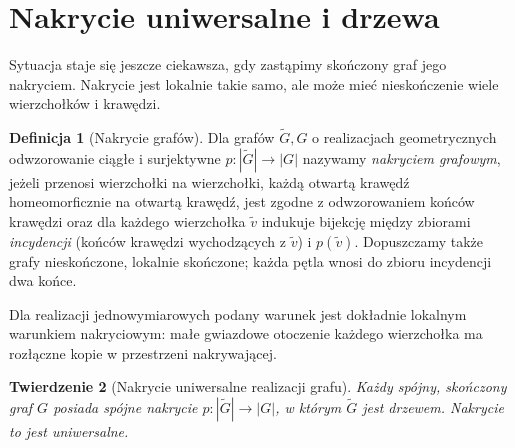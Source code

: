 \documentclass[11pt,a4paper]{report}
\numberwithin{equation}{section}
\theoremstyle{plain}
\newtheorem{twierdzenie}{Twierdzenie}[section]
\theoremstyle{definition}
\newtheorem{definicja}[twierdzenie]{Definicja}
\theoremstyle{remark}
\begin{document}
\begin{center}
\end{center}

\section{Nakrycie uniwersalne i drzewa}
\label{sec:tg-universal-cover}

Sytuacja staje się jeszcze ciekawsza, gdy zastąpimy skończony graf
jego nakryciem. Nakrycie jest lokalnie takie samo, ale może mieć
nieskończenie wiele wierzchołków i krawędzi.

\begin{definicja}[Nakrycie grafów]
Dla grafów $\widetilde G,G$ o realizacjach geometrycznych
odwzorowanie ciągłe i surjektywne
$p:|\widetilde G|\to|G|$ nazywamy
\emph{nakryciem grafowym}, jeżeli przenosi wierzchołki na
wierzchołki, każdą otwartą krawędź homeomorficznie na
otwartą krawędź, jest zgodne z odwzorowaniem końców
krawędzi oraz dla każdego wierzchołka
$\widetilde v$ indukuje bijekcję między zbiorami
\emph{incydencji} (końców krawędzi wychodzących z
$\widetilde v$) i $p(\widetilde v)$.
Dopuszczamy także grafy nieskończone, lokalnie skończone;
każda pętla wnosi do zbioru incydencji dwa końce.
\end{definicja}

Dla realizacji jednowymiarowych podany warunek jest dokładnie
lokalnym warunkiem nakryciowym: małe gwiazdowe otoczenie
każdego wierzchołka ma rozłączne kopie w przestrzeni nakrywającej.

\begin{twierdzenie}[Nakrycie uniwersalne realizacji grafu]
\label{thm:tg-universal}
Każdy spójny, skończony graf $G$ posiada spójne nakrycie
$p:|\widetilde G|\to|G|$, w którym $\widetilde G$ jest drzewem.
Nakrycie to jest uniwersalne.
\end{twierdzenie}
\end{document}
